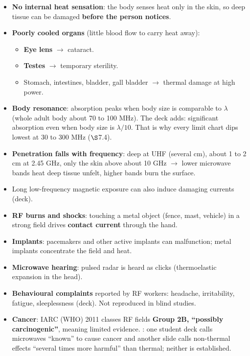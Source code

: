 \par{}
\begin{itemize}
  \item \textbf{No internal heat sensation}: the body senses heat only in the skin, so deep
    tissue can be damaged \textbf{before the person notices}.
  \item \textbf{Poorly cooled organs} (little blood flow to carry heat away):
  \begin{itemize}
    \item \textbf{Eye lens} $\rightarrow$ cataract.
    \item \textbf{Testes} $\rightarrow$ temporary sterility.
    \item Stomach, intestines, bladder, gall bladder $\rightarrow$ thermal damage at high power.
  \end{itemize}
  \item \textbf{Body resonance}: absorption peaks when body size is comparable to $\lambda$
    (whole adult body about 70 to 100 MHz). The deck adds: significant absorption even when
    body size is $\lambda/10$. That is why every limit chart dips lowest at 30 to 300 MHz
    ($\S$7.4).
  \item \textbf{Penetration falls with frequency}: deep at UHF (several cm), about 1 to 2 cm
    at 2.45 GHz, only the skin above about 10 GHz $\rightarrow$ lower microwave bands heat
    deep tissue unfelt, higher bands burn the surface. \added{}
  \item Long low-frequency magnetic exposure can also induce damaging currents (deck).
\end{itemize}

\par{}
\begin{itemize}
  \item \textbf{RF burns and shocks}: touching a metal object (fence, mast, vehicle) in a
    strong field drives \textbf{contact current} through the hand.
  \item \textbf{Implants}: pacemakers and other active implants can malfunction; metal
    implants concentrate the field and heat.
  \item \textbf{Microwave hearing}: pulsed radar is heard as clicks (thermoelastic
    expansion in the head).
  \item \textbf{Behavioural complaints} reported by RF workers: headache, irritability,
    fatigue, sleeplessness (deck). Not reproduced in blind studies.
  \item \textbf{Cancer}: IARC (WHO) 2011 classes RF fields \textbf{Group 2B, ``possibly
    carcinogenic''}, meaning limited evidence. : one student deck calls
    microwaves ``known'' to cause cancer and another slide calls non-thermal effects
    ``several times more harmful'' than thermal; neither is established. \added{}
\end{itemize}

